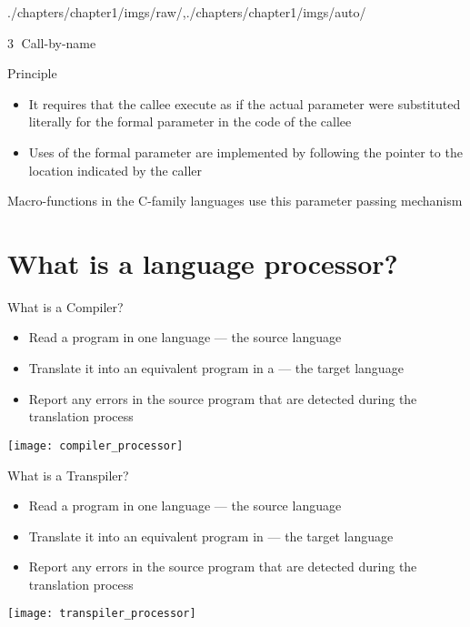 \begin{graphicspathcontext}{{./chapters/chapter1/imgs/raw/},{./chapters/chapter1/imgs/auto/}}
\begin{bibunit}[apalike]
\begin{frame}{\textcircled{3} Call-by-name}
	\begin{block}{Principle}
		\begin{itemize}
			\item It requires that the callee execute as if the actual parameter were substituted literally for the formal parameter in the code of the callee
			\item Uses of the formal parameter are implemented by following the pointer to the location indicated by the caller
		\end{itemize}
	\end{block}
	\vspace{1cm}
	\begin{example}
		Macro-functions in the C-family languages use this parameter passing mechanism
	\end{example}
\end{frame}


\section[Language processor]{What is a language processor?}

\sectiontableofcontentslide

\begin{frame}{{What is a} Compiler?}
	\begin{itemize}
	\item Read a program in one language --- the source language
	\item Translate it into an equivalent program in a  --- the target language
	\vfill
	\item Report any errors in the source program that are detected during the translation process
	\end{itemize}
	\vfill
	\begin{center}
		\texttt{[image: compiler\_processor]}
	\end{center}
\end{frame}

\begin{frame}{{What is a} Transpiler?}
	\begin{itemize}
		\item Read a program in one language --- the source language
		\item Translate it into an equivalent program in  --- the target language
		\vfill
		\item Report any errors in the source program that are detected during the translation process
	\end{itemize}
	\vfill
	\begin{center}
		\texttt{[image: transpiler\_processor]}
	\end{center}
\end{frame}


\end{bibunit}
\end{graphicspathcontext}
